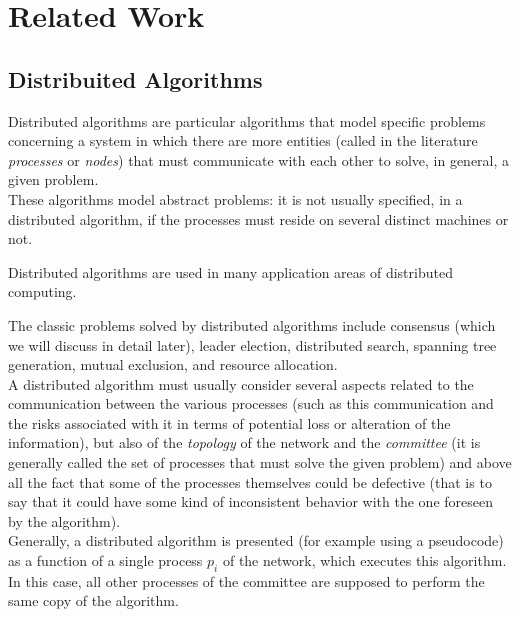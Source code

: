 \chapter{Related Work}


\section{Distribuited Algorithms}

Distributed algorithms are particular algorithms that model specific problems concerning a system in which there are more entities (called in the literature \textit{processes} or \textit{nodes}) that must communicate with each other to solve, in general, a given problem.\\
These algorithms model abstract problems: it is not usually specified, in a distributed algorithm, if the processes must reside on several distinct machines or not.

Distributed algorithms are used in many application areas of distributed computing.

The classic problems solved by distributed algorithms include consensus (which we will discuss in detail later), leader election, distributed search, spanning tree generation, mutual exclusion, and resource allocation.\\

A distributed algorithm must usually consider several aspects related to the communication between the various processes (such as this communication and the risks associated with it in terms of potential loss or alteration of the information), but also of the \textit{topology} of the network and the \textit{committee} (it is generally called the set of processes that must solve the given problem) and above all the fact that some of the processes themselves could be defective (that is to say that it could have some kind of inconsistent behavior with the one foreseen by the algorithm).\\

Generally, a distributed algorithm is presented (for example using a pseudocode) as a function of a single process $p_i$ of the network, which executes this algorithm. In this case, all other processes of the committee are supposed to perform the same copy of the algorithm.\\

